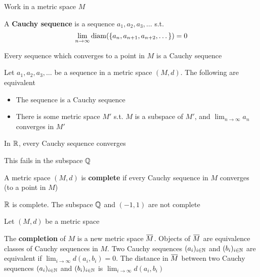 \documentclass[11pt]{article}
\begin{document}
Work in a metric space \(M\)
\begin{definition}[]
A \textbf{Cauchy sequence} is a sequence \(a_1,a_2,a_3,\dots\) s.t.
\begin{equation*}
\lim_{n\to\infty}\operatorname{diam}(\{a_n,a_{n+1},a_{n+2},\dots\})=0
\end{equation*}
\end{definition}

\begin{proposition}[]
Every sequence which converges to a point in \(M\) is a Cauchy sequence
\end{proposition}

\begin{proposition}[]
Let \(a_1,a_2,a_3,\dots\) be a sequence in a metric space \((M,d)\). The following are equivalent
\begin{itemize}
\item The sequence is a Cauchy sequence
\item There is some metric space \(M'\) s.t. \(M\) is a subspace of \(M'\), and \(\lim_{n\to\infty}a_n\)
converges in \(M'\)
\end{itemize}
\end{proposition}

\begin{proposition}[]
In \(\mathbb{R}\), every Cauchy sequence converges
\end{proposition}

This fails in the subspace \(\mathbb{Q}\)

\begin{definition}[]
A metric space \((M,d)\) is \textbf{complete} if every Cauchy sequence in \(M\) converges (to a point in \(M\))
\end{definition}

\begin{examplle}[]
\(\mathbb{R}\) is complete. The subspace \(\mathbb{Q}\) and \((-1,1)\) are not complete
\end{examplle}

Let \((M,d)\) be a metric space

\begin{definition}[]
The \textbf{completion} of \(M\) is a new metric space \(\barM\). Objects of \(\barM\) are equivalence
classes of Cauchy sequences in \(M\). Two Cauchy sequences \((a_i)_{i\in\mathbb{N}}\) and \((b_i)_{i\in\mathbb{N}}\) are
equivalent if \(\lim_{i\to\infty}d(a_i,b_i)=0\). The distance in \(\barM\) between two Cauchy
sequences \((a_i)_{i\in\mathbb{N}}\) and \((b_i)_{i\in\mathbb{N}}\) is \(\lim_{i\to\infty}d(a_i,b_i)\)
\end{definition}
\end{document}
